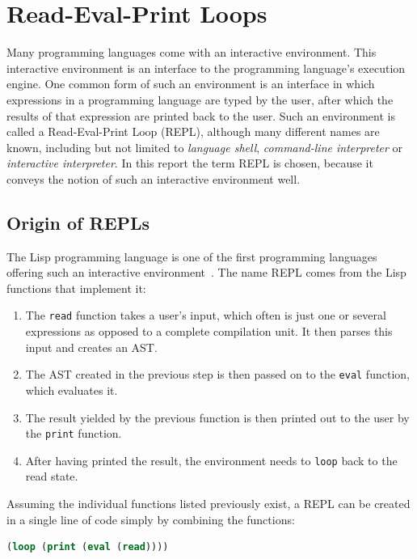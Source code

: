 \section{Read-Eval-Print Loops}
\label{sec:repl}

Many programming languages come with an interactive environment. This
interactive environment is an interface to the programming language's execution
engine. One common form of such an environment is an interface in which
expressions in a programming language are typed by the user, after which the
results of that expression are printed back to the user. Such an environment is
called a Read-Eval-Print Loop (REPL), although many different names are known,
including but not limited to \emph{language shell}, \emph{command-line
  interpreter} or \emph{interactive interpreter}. In this report the term REPL
is chosen, because it conveys the notion of such an interactive environment
well.

\subsection{Origin of REPLs}
\label{ssec:repl-origin}

The Lisp programming language is one of the first programming languages offering
such an interactive environment~\cite{Noyes92}. The name REPL comes from the
Lisp functions that implement it:

\begin{enumerate}
  \item The \texttt{read} function takes a user's input, which often is just one
    or several expressions as opposed to a complete compilation unit. It then
    parses this input and creates an AST.
  \item The AST created in the previous step is then passed on to the
    \texttt{eval} function, which evaluates it.
  \item The result yielded by the previous function is then printed out to the
    user by the \texttt{print} function.
  \item After having printed the result, the environment needs to \texttt{loop}
    back to the read state.
\end{enumerate}

Assuming the individual functions listed previously exist, a REPL can be created
in a single line of code simply by combining the functions:

\begin{lstlisting}[language=lisp]
(loop (print (eval (read))))
\end{lstlisting}

